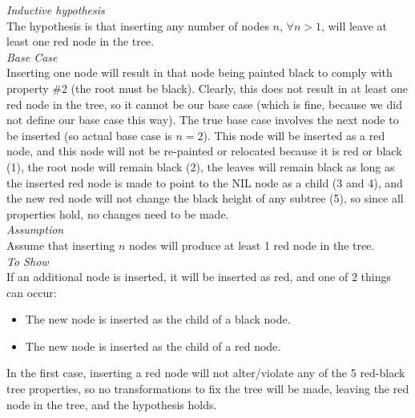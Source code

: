 \documentclass[11pts]{article}
\begin{document}
\begin{enumerate}
  \textit{Inductive hypothesis} \\
  The hypothesis is that inserting any number of nodes $n$, $\forall n > 1$,
  will leave at least one red node in the tree. \\

  \textit{Base Case} \\
  Inserting one node will result in that node being painted black to comply
  with property \#2 (the root must be black). Clearly, this does not result
  in at least one red node in the tree, so it cannot be our base case
  (which is fine, because we did not define our base case this way).
  The true base case involves the next
  node to be inserted (so actual base case is $n = 2$). This node will
  be inserted
  as a red node, and this node will not be re-painted or relocated because it
  is red or black (1), the root node will remain black (2), the leaves will
  remain black as long as the inserted red node is made to point to the NIL
  node as a child (3 and 4), and the new red node will not change the black
  height of any subtree (5), so since all properties hold, no changes
  need to be made. \\

  \textit{Assumption} \\
  Assume that inserting $n$ nodes will produce at least 1 red node in
  the tree. \\

  \textit{To Show} \\
  If an additional node is inserted, it will be inserted as red, and one of
  2 things can occur:
    \begin{itemize}
      \item The new node is inserted as the child of a black node. \\
      \item The new node is inserted as the child of a red node.
    \end{itemize}
  In the first case, inserting a red node will not alter/violate any of
  the 5 red-black tree properties, so no transformations to fix the tree
  will be made, leaving the red node in the tree, and the hypothesis holds.


\end{enumerate}
\end{document}
